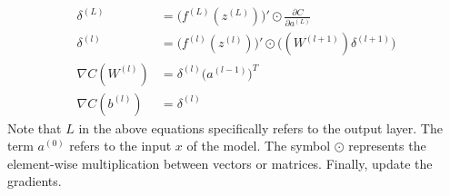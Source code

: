 \documentclass[12pt]{article}
\begin{document}
\begin{align}
    \delta^{(L)} &= \big(f^{(L)}(z^{(L)})\big)' \odot \frac{\partial C}{\partial a^{(L)}}\\
    \delta^{(l)} &= \big(f^{(l)}(z^{(l)})\big)' \odot \big( (W^{(l+1)}) \delta^{(l+1)} \big)\\
    \nabla C(W^{(l)}) &= \delta^{(l)} \big(a^{(l-1)}\big)^T \\
    \nabla C(b^{(l)}) &= \delta^{(l)} 
\end{align}
Note that $L$ in the above equations specifically refers to the output layer. The term $a^{(0)}$ refers to the input $x$ of the model. The symbol $\odot$ represents the element-wise multiplication between vectors or matrices. Finally, update the gradients.
\end{document}

